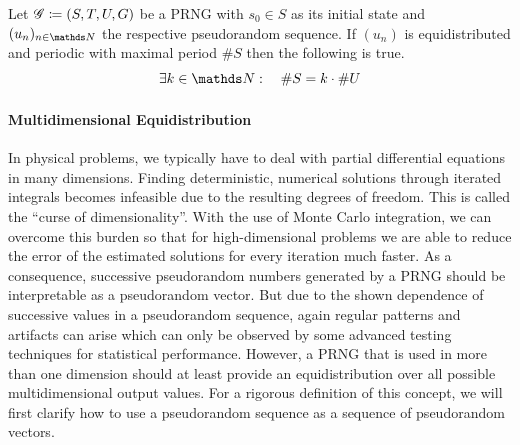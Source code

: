 \documentclass{stdlocal}
\begin{document}
    \begin{corollary}
      Let $\mathscr{G}\coloneqq (S,T,U,G)$ be a PRNG with $s_0\in S$ as its initial state and $(u_n)_{n\in\setNatural}$ the respective pseudorandom sequence.
      If $(u_n)$ is equidistributed and periodic with maximal period $\# S$ then the following is true.
      \[
        \exists k\in\setNatural:\quad \# S = k \cdot \# U
      \]
    \end{corollary}


    \paragraph{Multidimensional Equidistribution}
    In physical problems, we typically have to deal with partial differential equations in many dimensions.
    Finding deterministic, numerical solutions through iterated integrals becomes infeasible due to the resulting degrees of freedom.
    This is called the \enquote{curse of dimensionality}.
    With the use of Monte Carlo integration, we can overcome this burden so that for high-dimensional problems we are able to reduce the error of the estimated solutions for every iteration much faster.
    As a consequence, successive pseudorandom numbers generated by a PRNG should be interpretable as a pseudorandom vector.
    But due to the shown dependence of successive values in a pseudorandom sequence, again regular patterns and artifacts can arise which can only be observed by some advanced testing techniques for statistical performance.
    However, a PRNG that is used in more than one dimension should at least provide an equidistribution over all possible multidimensional output values.
    For a rigorous definition of this concept, we will first clarify how to use a pseudorandom sequence as a sequence of pseudorandom vectors.
\end{document}
